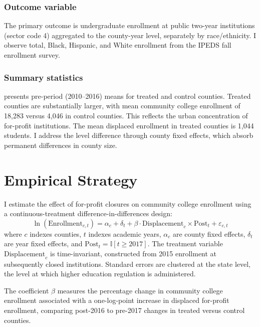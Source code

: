 \documentclass[12pt]{article}
\newcommand{\ind}{\mathbb{I}}
\begin{document}
\subsubsection*{Outcome variable} The primary outcome is undergraduate enrollment at public two-year institutions (sector code 4) aggregated to the county-year level, separately by race/ethnicity. I observe total, Black, Hispanic, and White enrollment from the IPEDS fall enrollment survey.

\subsubsection*{Summary statistics}  presents pre-period (2010--2016) means for treated and control counties. Treated counties are substantially larger, with mean community college enrollment of 18,283 versus 4,046 in control counties. This reflects the urban concentration of for-profit institutions. The mean displaced enrollment in treated counties is 1,044 students. I address the level difference through county fixed effects, which absorb permanent differences in county size.



\section{Empirical Strategy}

I estimate the effect of for-profit closures on community college enrollment using a continuous-treatment difference-in-differences design:
\begin{equation}
\ln(\text{Enrollment}_{c,t}) = \alpha_c + \delta_t + \beta \cdot \text{Displacement}_c \times \text{Post}_t + \varepsilon_{c,t}
\label{eq:main}
\end{equation}
where $c$ indexes counties, $t$ indexes academic years, $\alpha_c$ are county fixed effects, $\delta_t$ are year fixed effects, and $\text{Post}_t = \ind[t \geq 2017]$. The treatment variable $\text{Displacement}_c$ is time-invariant, constructed from 2015 enrollment at subsequently closed institutions. Standard errors are clustered at the state level, the level at which higher education regulation is administered.

The coefficient $\beta$ measures the percentage change in community college enrollment associated with a one-log-point increase in displaced for-profit enrollment, comparing post-2016 to pre-2017 changes in treated versus control counties.
\end{document}
